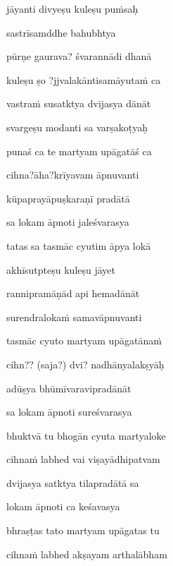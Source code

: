 \ujvers\nemsloka 
jāyanti divyeṣu kuleṣu puṁsaḥ
\dontdisplaylinenum

\nemslokab 
sastrīsamddhe bahubhtya \danda\dontdisplaylinenum

\nemslokac 
pūrṇe gaurava? śvarannādi dhanā
\dontdisplaylinenum

\nemslokad 
kuleṣu ṣo ?jjvalakāntisamāyutaṁ ca \veg\dontdisplaylinenum 

\ujvers\nemsloka 
vastraṁ susatktya dvijasya dānāt
\dontdisplaylinenum

\nemslokab 
svargeṣu modanti sa varṣakoṭyaḥ \danda\dontdisplaylinenum

\nemslokac 
punaś ca te martyam upāgatāś ca
\dontdisplaylinenum

\nemslokad 
cihna?āha?krīyavam āpnuvanti \veg\dontdisplaylinenum

\ujvers\nemsloka 
kūpaprayāpuṣkaraṇī pradātā
\dontdisplaylinenum

\nemslokab 
sa lokam āpnoti jaleśvarasya \danda\dontdisplaylinenum

\nemslokac 
tatas sa tasmāc cyutim āpya lokā
\dontdisplaylinenum

\nemslokad 
akhīsutpteṣu kuleṣu jāyet \veg\dontdisplaylinenum

\ujvers\nemsloka 
rannipramāṇād api hemadānāt
\dontdisplaylinenum

\nemslokab 
surendralokaṁ samavāpnuvanti \danda\dontdisplaylinenum

\nemslokac 
tasmāc cyuto martyam upāgatānaṁ
\dontdisplaylinenum

\nemslokad 
cihn?? (saja?) dvi? nadhānyalakṣyāḥ \veg\dontdisplaylinenum

\ujvers\nemsloka 
adūṣya bhūmīvaravipradānāt
\dontdisplaylinenum

\nemslokab 
sa lokam āpnoti sureśvarasya \danda\dontdisplaylinenum

\nemslokac 
bhuktvā tu bhogān cyuta martyaloke
\dontdisplaylinenum

\nemslokad 
cihnaṁ labhed vai viṣayādhipatvam \veg\dontdisplaylinenum

\ujvers\nemsloka 
dvijasya satktya tilapradātā sa
\dontdisplaylinenum

\nemslokab 
lokam āpnoti ca keśavasya \danda\dontdisplaylinenum

\nemslokac 
bhraṣṭas tato martyam upāgatas tu
\dontdisplaylinenum

\nemslokad 
cihnaṁ labhed akṣayam arthalābham \veg\dontdisplaylinenum

